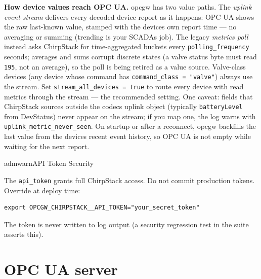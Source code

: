 \textbf{How device values reach OPC UA.} opcgw has two value paths. The \emph{uplink event stream} delivers every decoded device report as it happens: OPC UA shows the raw last-known value, stamped with the device\textquotesingle s own report time --- no averaging or summing (trending is your SCADA\textquotesingle s job). The legacy \emph{metrics poll} instead asks ChirpStack for time-aggregated buckets every \texttt{polling\_frequency} seconds; averages and sums corrupt discrete states (a valve status byte must read \texttt{195}, not an average), so the poll is being retired as a value source. Valve-class devices (any device whose command has \texttt{command\_class\ =\ "valve"}) always use the stream. Set \texttt{stream\_all\_devices\ =\ true} to route every device with read metrics through the stream --- the recommended setting. One caveat: fields that ChirpStack sources outside the codec\textquotesingle s uplink object (typically \texttt{batteryLevel} from DevStatus) never appear on the stream; if you map one, the log warns with \texttt{uplink\_metric\_never\_seen}. On startup or after a reconnect, opcgw backfills the last value from the device\textquotesingle s recent event history, so OPC UA is not empty while waiting for the next report.

\begin{admonition}{admwarn}{API Token Security}

The \texttt{api\_token} grants full ChirpStack access. Do not commit production tokens. Override at deploy time:

\begin{lstlisting}
export OPCGW_CHIRPSTACK__API_TOKEN="your_secret_token"
\end{lstlisting}

The token is never written to log output (a security regression test in the suite asserts this).

\end{admonition}

\section{OPC UA server}\label{sec-opcua-config}

